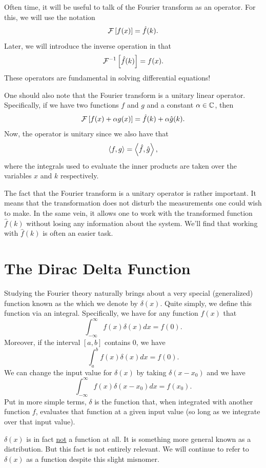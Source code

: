 Often time, it will be useful to talk of the Fourier transform as an operator. For this, we will use the notation
\[
\mathcal{F}\left[ f(x) \right]= \hat{f}(k).
\]
Later, we will introduce the inverse operation in that 
\[
\mathcal{F}^{-1}\left[ \hat{f}(k) \right]=f(x).
\]
These operators are fundamental in solving differential equations!

One should also note that the Fourier transform is a unitary linear operator.  Specifically, if we have two functions $f$ and $g$ and a constant $\alpha\in \mathbb{C}$, then
\[
\mathcal{F}\left[ f(x)+\alpha g(x) \right] = \hat{f}(k)+\alpha \hat{g}(k).
\]
Now, the operator is unitary since we also have that
\[
\left\langle f, g \right\rangle = \left\langle \hat{f}, \hat{g} \right\rangle,
\]
where the integrals used to evaluate the inner products are taken over the variables $x$ and $k$ respectively.  

The fact that the Fourier transform is a unitary operator is rather important. It means that the transformation does not disturb the measurements one could wish to make. In the same vein, it allows one to work with the transformed function $\hat{f}(k)$ without losing any information about the system. We'll find that working with $\hat{f}(k)$ is often an easier task.

\section{The Dirac Delta Function}

Studying the Fourier theory naturally brings about a very special (generalized) function known as the  which we denote by $\delta(x)$.  Quite simply, we define this function via an integral. Specifically, we have for any function $f(x)$ that
\[
\int_{-\infty}^\infty f(x)\delta(x) dx = f(0).
\]
Moreover, if the interval $[a,b]$ contains $0$, we have
\[
\int_a^b f(x)\delta(x) dx = f(0).
\]
We can change the input value for $\delta(x)$ by taking $\delta(x-x_0)$ and we have
\[
\int_{-\infty}^\infty f(x)\delta(x-x_0)dx = f(x_0).
\]
Put in more simple terms, $\delta$ is the function that, when integrated with another function $f$, evaluates that function at a given input value (so long as we integrate over that input value).  

\begin{remark}
	$\delta(x)$ is in fact \underline{not} a function at all. It is something more general known as a distribution. But this fact is not entirely relevant. We will continue to refer to $\delta(x)$ as a function despite this slight misnomer.
\end{remark}


